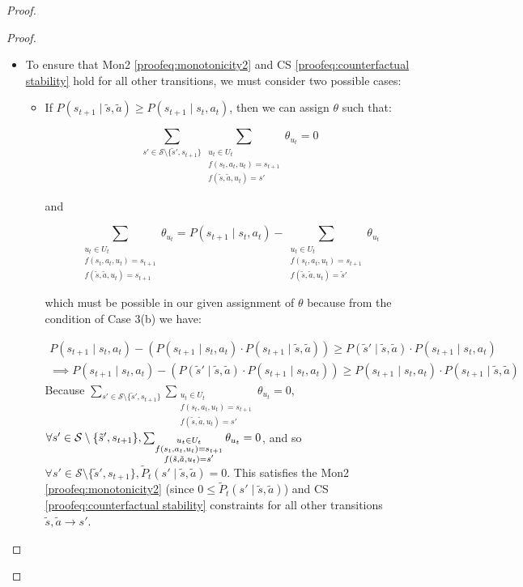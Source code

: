 \begin{proof}
\begin{proof}
\begin{itemize}
    \item To ensure that Mon2 \eqref{proofeq:monotonicity2} and CS \eqref{proofeq:counterfactual stability} hold for all other transitions, we must consider two possible cases:

    \begin{itemize}
        \item If $P(s_{t+1} \mid \tilde{s}, \tilde{a}) \geq P(s_{t+1} \mid s_t, a_t)$, then we can assign $\theta$ such that:
        
        \[
            \sum_{s' \in \mathcal{S}\setminus\{\tilde{s}', s_{t+1}\}}\sum_{\substack{u_t \in U_t \\f(s_t, a_t, u_t) = s_{t+1} \\ f(\tilde{s}, \tilde{a}, u_t) = s'}}{\theta_{u_t}} = 0
        \]

        and 

        \[
            \sum_{\substack{u_t \in U_t \\f(s_t, a_t, u_t) = s_{t+1} \\ f(\tilde{s}, \tilde{a}, u_t) = s_{t+1}}}{\theta_{u_t}} = P(s_{t+1} \mid s_t, a_t) - \sum_{\substack{u_t \in U_t \\f(s_t, a_t, u_t) = s_{t+1} \\ f(\tilde{s}, \tilde{a}, u_t) = \tilde{s}'}}{\theta_{u_t}}
        \]

        which must be possible in our given assignment of $\theta$ because from the condition of Case 3(b) we have:

        \begin{align*}
            P(s_{t+1} \mid s_t, a_t) - (P(s_{t+1} \mid s_t, a_t) \cdot P(s_{t+1} \mid \tilde{s}, \tilde{a})) \geq P(\tilde{s}' \mid \tilde{s}, \tilde{a}) \cdot P(s_{t+1} \mid s_t, a_t) \\ \implies P(s_{t+1} \mid s_t, a_t) - ( P(\tilde{s}' \mid \tilde{s}, \tilde{a}) \cdot P(s_{t+1} \mid s_t, a_t))\geq P(s_{t+1} \mid s_t, a_t) \cdot P(s_{t+1} \mid \tilde{s}, \tilde{a})
        \end{align*}
        Because $\sum_{s' \in \mathcal{S}\setminus\{\tilde{s}', s_{t+1}\}}\sum_{\substack{u_t \in U_t \\f(s_t, a_t, u_t) = s_{t+1} \\ f(\tilde{s}, \tilde{a}, u_t) = s'}}{\theta_{u_t}} = 0$, $\forall s' \in \mathcal{S} \setminus \{\tilde{s}', s_{t+1}\}, \sum_{\substack{u_t \in U_t \\f(s_t, a_t, u_t) = s_{t+1} \\ f(\tilde{s}, \tilde{a}, u_t) = s'}}{\theta_{u_t}} \\= 0$, and so $\forall s' \in \mathcal{S} \setminus \{\tilde{s}', s_{t+1}\}, \tilde{P}_t(s' \mid \tilde{s}, \tilde{a}) = 0$. This satisfies the Mon2 \eqref{proofeq:monotonicity2} (since $0 \leq \tilde{P}_t(s' \mid \tilde{s}, \tilde{a})$) and CS \eqref{proofeq:counterfactual stability} constraints for all other transitions $\tilde{s}, \tilde{a} \rightarrow s'$.


\end{itemize}
\end{itemize}
\end{proof}
\end{proof}
